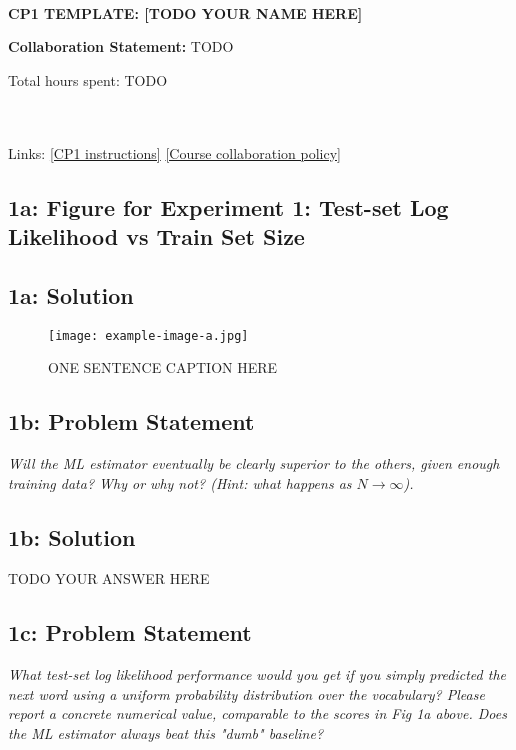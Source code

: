 \documentclass[12pt]{article}
\newcommand{\officialdirections}[1]{{\color{purple} #1}}
\begin{document}
~~\\ %

{\Large{\bf CP1 TEMPLATE: [TODO YOUR NAME HERE] }}

\Large{\bf Collaboration Statement:} TODO


Total hours spent: TODO

~~\\
~~\\
Links: 
\href{https://www.cs.tufts.edu/cs/136/2024s/cp1.html}{[CP1 instructions]} 
\href{https://www.cs.tufts.edu/cs/136/2024s/index.html#collaboration}{[Course collaboration policy]} 

\setcounter{tocdepth}{2}
\tableofcontents

\newpage

\officialdirections{
\subsection*{1a: Figure for Experiment 1: Test-set Log Likelihood vs Train Set Size }
}

\subsection{1a: Solution}

\begin{figure}[!h]
     \centering
     \texttt{[image: example-image-a.jpg]} %
     \caption{ONE SENTENCE CAPTION HERE}
     \label{fig:fig1a}
\end{figure}


\newpage 
\officialdirections{
\subsection*{1b: Problem Statement}

\emph{\large
 Will the ML estimator eventually be clearly superior to the others, given enough training data? Why or why not? (Hint: what happens as $N \rightarrow \infty$).
}}

\subsection{1b: Solution}

TODO YOUR ANSWER HERE

\officialdirections{
\subsection*{1c: Problem Statement}
\emph{\large
What test-set log likelihood performance would you get if you simply predicted the next word using a uniform probability distribution over the vocabulary? Please report a concrete numerical value, comparable to the scores in Fig 1a above. Does the ML estimator always beat this "dumb" baseline?
}}
\end{document}
